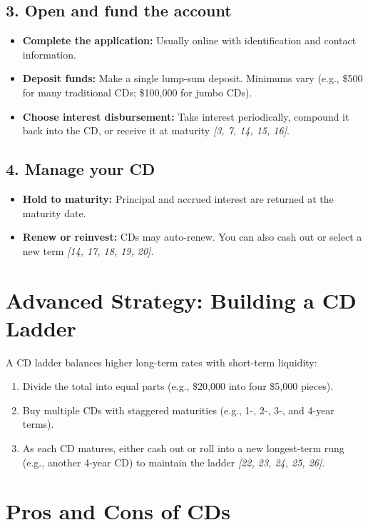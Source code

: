 \documentclass[11pt]{article}
\begin{document}
\subsection*{3. Open and fund the account}
\begin{itemize}
  \item \textbf{Complete the application:} Usually online with identification and contact information.
  \item \textbf{Deposit funds:} Make a single lump-sum deposit. Minimums vary (e.g., \$500 for many traditional CDs; \$100{,}000 for jumbo CDs).
  \item \textbf{Choose interest disbursement:} Take interest periodically, compound it back into the CD, or receive it at maturity \textit{[3, 7, 14, 15, 16]}.
\end{itemize}

\subsection*{4. Manage your CD}
\begin{itemize}
  \item \textbf{Hold to maturity:} Principal and accrued interest are returned at the maturity date.
  \item \textbf{Renew or reinvest:} CDs may auto-renew. You can also cash out or select a new term \textit{[14, 17, 18, 19, 20]}.
\end{itemize}

\section*{Advanced Strategy: Building a CD Ladder}
A CD ladder balances higher long-term rates with short-term liquidity:
\begin{enumerate}
  \item Divide the total into equal parts (e.g., \$20{,}000 into four \$5{,}000 pieces).
  \item Buy multiple CDs with staggered maturities (e.g., 1-, 2-, 3-, and 4-year terms).
  \item As each CD matures, either cash out or roll into a new longest-term rung (e.g., another 4-year CD) to maintain the ladder \textit{[22, 23, 24, 25, 26]}.
\end{enumerate}

\section*{Pros and Cons of CDs}
\end{document}
